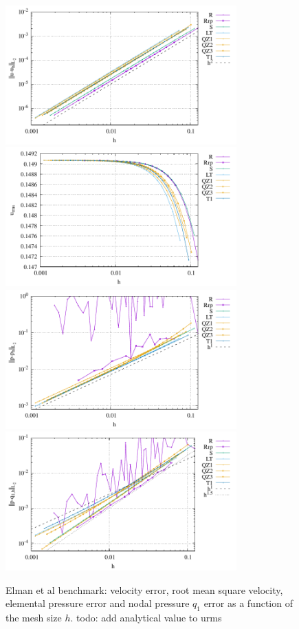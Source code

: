 \documentclass[a4paper,12pt]{article}
\begin{document}
\begin{figure}
\centering
\includegraphics[width=8.9cm]{../results/errors_u_exp7}
\includegraphics[width=8.9cm]{../results/vrms_exp7} \\
\includegraphics[width=8.9cm]{../results/errors_p_exp7}
\includegraphics[width=8.9cm]{../results/errors_q1_exp7}
\caption{Elman et al benchmark: velocity error, 
root mean square velocity, elemental pressure error and nodal pressure $q_1$ error
as a function of the mesh size $h$.{\color{red} todo: add analytical value to urms}}
\label{fig:resexp7}
\end{figure}
\end{document}
